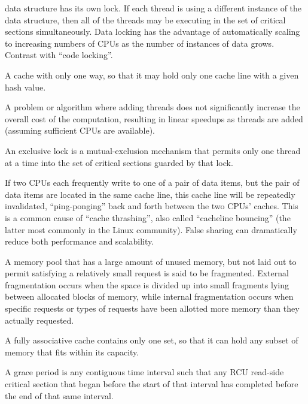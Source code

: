 \begin{description}
	data structure has its own lock.
	If each thread is using a different instance of the
	data structure, then all of the threads may be executing in
	the set of critical sections simultaneously.
	Data locking has the advantage of automatically scaling to
	increasing numbers of CPUs as the number of instances of
	data grows.
	Contrast with ``code locking''.
\item[\IXh{Direct-Mapped Cache}{Cache}{direct-mapped}:]
	A cache with only one way, so that it may hold only one cache
	line with a given hash value.
\item[Embarrassingly Parallel:]
	A problem or algorithm where adding threads does not significantly
	increase the overall cost of the computation, resulting in
	linear speedups as threads are added (assuming sufficient
	CPUs are available).
\item[\IXh{Exclusive Lock}{Lock}{exclusive}:]
	An exclusive lock is a mutual-exclusion mechanism that
	permits only one thread at a time into the
	set of critical sections guarded by that lock.
\item[False Sharing:]
	If two CPUs each frequently write to one of a pair of data items,
	but the pair of data items are located in the same cache line,
	this cache line will be repeatedly invalidated, ``ping-ponging''
	back and forth between the two CPUs' caches.
	This is a common cause of ``cache thrashing'', also called
	``cacheline bouncing'' (the latter most commonly in the Linux
	community).
	False sharing can dramatically reduce both performance and
	scalability.
\item[Fragmentation:]
	A memory pool that has a large amount of unused memory, but
	not laid out to permit satisfying a relatively small request
	is said to be fragmented.
	External fragmentation occurs when the space is divided up
	into small fragments lying between allocated blocks of memory,
	while internal fragmentation occurs when specific requests or
	types of requests have been allotted more memory than they
	actually requested.
\item[\IXh{Fully Associative Cache}{Cache}{fully associative}:]
	A fully associative cache contains only
	one set, so that it can hold any subset of
	memory that fits within its capacity.
\item[Grace Period:]
	A grace period is any contiguous time interval such that
	any RCU read-side critical section that began before the
	start of that interval has
	completed before the end of that same interval.

\end{description}
